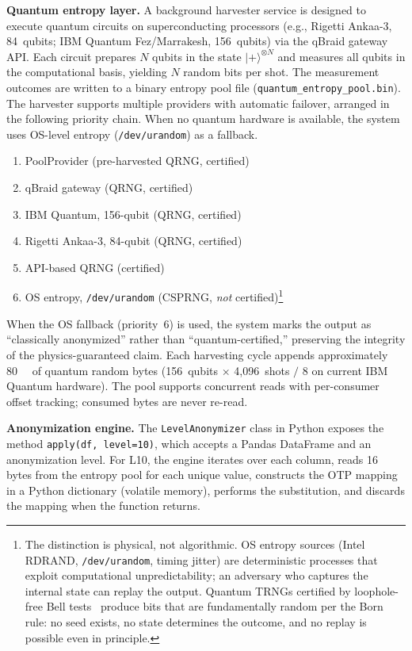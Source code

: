 \documentclass[journal]{IEEEtran}
\begin{document}
\textbf{Quantum entropy layer.} A background harvester service is designed to execute quantum circuits on superconducting processors (e.g., Rigetti Ankaa-3, 84~qubits; IBM Quantum Fez/Marrakesh, 156~qubits) via the qBraid gateway API. Each circuit prepares $N$ qubits in the state $|{+}\rangle^{\otimes N}$ and measures all qubits in the computational basis, yielding $N$ random bits per shot. The measurement outcomes are written to a binary entropy pool file (\texttt{quantum\_entropy\_pool.bin}). The harvester supports multiple providers with automatic failover, arranged in the following priority chain. When no quantum hardware is available, the system uses OS-level entropy (\texttt{/dev/urandom}) as a fallback.
\begin{enumerate}
\item PoolProvider (pre-harvested QRNG, certified)
\item qBraid gateway (QRNG, certified)
\item IBM Quantum, 156-qubit (QRNG, certified)
\item Rigetti Ankaa-3, 84-qubit (QRNG, certified)
\item API-based QRNG (certified)
\item OS entropy, \texttt{/dev/urandom} (CSPRNG, \emph{not} certified)\footnote{The distinction is physical, not algorithmic. OS entropy sources (Intel RDRAND, \texttt{/dev/urandom}, timing jitter) are deterministic processes that exploit computational unpredictability; an adversary who captures the internal state can replay the output. Quantum TRNGs certified by loophole-free Bell tests~\cite{hensen2015loophole} produce bits that are fundamentally random per the Born rule: no seed exists, no state determines the outcome, and no replay is possible even in principle.}
\end{enumerate}

When the OS fallback (priority~6) is used, the system marks the output as ``classically anonymized'' rather than ``quantum-certified,'' preserving the integrity of the physics-guaranteed claim. Each harvesting cycle appends approximately \SI{80}{\kilo\byte} of quantum random bytes (156~qubits $\times$ 4{,}096~shots $/$ 8 on current IBM Quantum hardware). The pool supports concurrent reads with per-consumer offset tracking; consumed bytes are never re-read.

\textbf{Anonymization engine.} The \texttt{LevelAnonymizer} class in Python exposes the method \texttt{apply(df, level=10)}, which accepts a Pandas DataFrame and an anonymization level. For L10, the engine iterates over each column, reads 16 bytes from the entropy pool for each unique value, constructs the OTP mapping in a Python dictionary (volatile memory), performs the substitution, and discards the mapping when the function returns.
\end{document}
